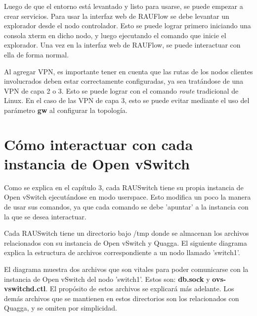 Luego de que el entorno está levantado y listo para usarse, se puede empezar a crear servicios. Para usar la interfaz web de RAUFlow se debe levantar un explorador desde el nodo controlador. Esto se puede lograr primero iniciando una consola xterm en dicho nodo, y luego ejecutando el comando que inicie el explorador. Una vez en la interfaz web de RAUFlow, se puede interactuar con ella de forma normal.

Al agregar VPN, es importante tener en cuenta que las rutas de los nodos clientes involucrados deben estar correctamente configuradas, ya sea tratándose de una VPN de capa 2 o 3. Esto se puede lograr con el comando \textit{route} tradicional de Linux. En el caso de las VPN de capa 3, esto se puede evitar mediante el uso del parámetro \textbf{gw} al configurar la topología.

\section{Cómo interactuar con cada instancia de Open vSwitch}
Como se explica en el capítulo 3, cada RAUSwitch tiene su propia instancia de Open vSwitch ejecutándose en modo userspace. Esto modifica un poco la manera de usar sus comandos, ya que cada comando se debe 'apuntar' a la instancia con la que se desea interactuar.

Cada RAUSwitch tiene un directorio bajo /tmp donde se almacenan los archivos relacionados con su instancia de Open vSwitch y Quagga. El siguiente diagrama explica la estructura de archivos correspondiente a un nodo llamado 'switch1'. 

El diagrama muestra dos archivos que son vitales para poder comunicarse con la instancia de Open vSwitch del nodo 'switch1'. Estos son: \textbf{db.sock} y \textbf{ovs-vswitchd.ctl}. El propósito de estos archivos se explicará más adelante. Los demás archivos que se mantienen en estos directorios son los relacionados con Quagga, y se omiten por simplicidad.

